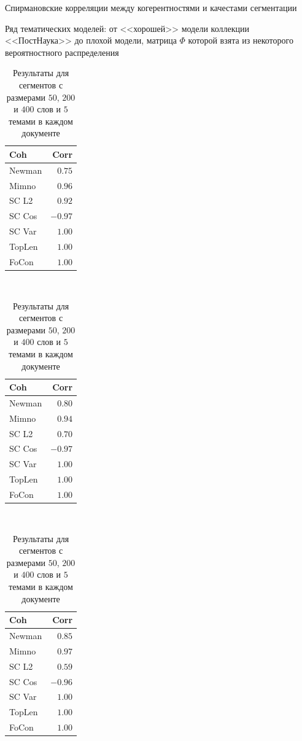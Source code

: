 \documentclass[russian]{beamer}
\begin{document}
\begin{frame}{Спирмановские корреляции между когерентностями и качестами сегментации}
  \begin{block}{}
    Ряд тематических моделей: от <<хорошей>> модели коллекции <<ПостНаука>> до плохой модели, матрица $\Phi$ которой взята из некоторого вероятностного распределения
  \end{block}
  \begin{table}[t]
    \begin{tabular}{lr}
      Coh & Corr\\
      \midrule
      Newman & $0.75$\\
      Mimno & $0.96$\\
      \midrule
      SC L2 & $0.92$\\
      SC Cos & $-0.97$\\
      SC Var & $\mathbf{1.00}$\\
      TopLen & $\mathbf{1.00}$\\
      FoCon & $\mathbf{1.00}$\\
      \bottomrule
    \end{tabular}
    ~
    \begin{tabular}{lr}
      Coh & Corr\\
      \midrule
      Newman & $0.80$\\
      Mimno & $0.94$\\
      \midrule
      SC L2 & $0.70$\\
      SC Cos & $-0.97$\\
      SC Var & $\mathbf{1.00}$\\
      TopLen & $\mathbf{1.00}$\\
      FoCon & $\mathbf{1.00}$\\
      \bottomrule
    \end{tabular}
    ~
    \begin{tabular}{lr}
      Coh & Corr\\
      \midrule
      Newman & $0.85$\\
      Mimno & $0.97$\\
      \midrule
      SC L2 & $0.59$\\
      SC Cos & $-0.96$\\
      SC Var & $\mathbf{1.00}$\\
      TopLen & $\mathbf{1.00}$\\
      FoCon & $\mathbf{1.00}$\\
      \bottomrule
    \end{tabular}
    \centering
    \captionsetup{justification=centering}
    \caption*{
      Результаты для сегментов с размерами $50$, $200$ и $400$ слов и $5$ темами в каждом документе
    }
  \end{table}
\end{frame}
\end{document}
